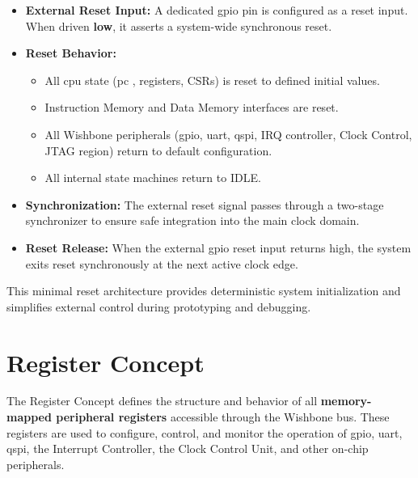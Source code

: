 \begin{itemize}
      \item \textbf{External Reset Input:}
            A dedicated \gls{gpio} pin is configured as a reset input. When driven \textbf{low}, it asserts a
            system-wide synchronous reset.

      \item \textbf{Reset Behavior:}
            \begin{itemize}
                  \item All \gls{cpu} state (\gls{pc} , registers, CSRs) is reset to defined initial
                        v\gls{alu}es.
                  \item Instruction Memory and Data Memory interfaces are reset.
                  \item All Wishbone peripherals (\gls{gpio}, \gls{uart}, \gls{qspi}, \gls{IRQ}
                        controller, Clock Control, JTAG region) return to default configuration.
                  \item All internal state machines return to IDLE.
            \end{itemize}

      \item \textbf{Synchronization:}
            The external reset signal passes through a two-stage synchronizer to ensure safe integration into the
            main clock domain.

      \item \textbf{Reset Release:}
            When the external \gls{gpio} reset input returns high, the system exits reset synchronously at the next
            active clock edge.

\end{itemize}

This minimal reset architecture provides deterministic system initialization
and simplifies external control during prototyping and debugging.

\section{Register Concept}
The Register Concept defines the structure and behavior of all
\textbf{memory-mapped peripheral registers} accessible through the Wishbone
bus. These registers are used to configure, control, and monitor the operation
of \gls{gpio}, \gls{uart}, \gls{qspi}, the Interrupt Controller, the Clock
Control Unit, and other on-chip peripherals.

